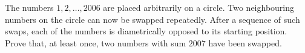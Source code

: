 The numbers $1,2,\ldots,2006$ are placed arbitrarily on a circle.
Two neighbouring numbers on the circle can now be swapped repeatedly.
After a sequence of such swaps, each of the numbers is diametrically opposed to its starting position.
Prove that, at least once, two numbers with sum $2007$ have been swapped.